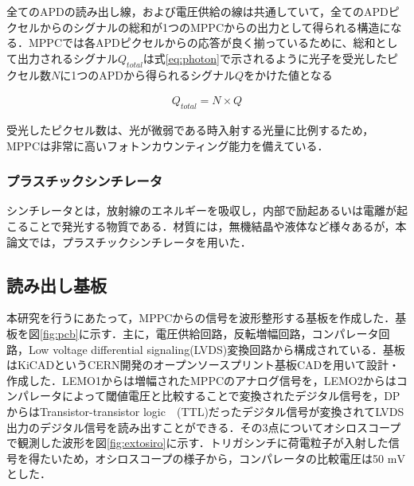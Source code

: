 全てのAPDの読み出し線，および電圧供給の線は共通していて，全てのAPDピクセルからのシグナルの総和が1つのMPPCからの出力として得られる構造になる．MPPCでは各APDピクセルからの応答が良く揃っているために、総和として出力されるシグナル$Q_{total}$は式\ref{eq:photon}で示されるように光子を受光したピクセル数$N$に1つのAPDから得られるシグナル$Q$をかけた値となる

\begin{eqnarray}
  \label{eq:photon}
  Q_{total} = N \times Q
\end{eqnarray}

受光したピクセル数は、光が微弱である時入射する光量に比例するため， MPPCは非常に高いフォトンカウンティング能力を備えている．

\subsubsection*{プラスチックシンチレータ}
シンチレータとは，放射線のエネルギーを吸収し，内部で励起あるいは電離が起こることで発光する物質である．材質には，無機結晶や液体など様々あるが，本論文では，プラスチックシンチレータを用いた．

%
%
%
%
\subsection{読み出し基板}
本研究を行うにあたって，MPPCからの信号を波形整形する基板を作成した．基板を図\ref{fig:pcb}に示す．主に，電圧供給回路，反転増幅回路，コンパレータ回路，Low voltage differential signaling(LVDS)変換回路から構成されている．基板はKiCADというCERN開発のオープンソースプリント基板CADを用いて設計・作成した．LEMO1からは増幅されたMPPCのアナログ信号を，LEMO2からはコンパレータによって閾値電圧と比較することで変換されたデジタル信号を，DPからはTransistor-transistor logic　(TTL)だったデジタル信号が変換されてLVDS出力のデジタル信号を読み出すことができる．その3点についてオシロスコープで観測した波形を図\ref{fig:extosiro}に示す．トリガシンチに荷電粒子が入射した信号を得たいため，オシロスコープの様子から，コンパレータの比較電圧は50 $\mathrm{mV}$とした．

